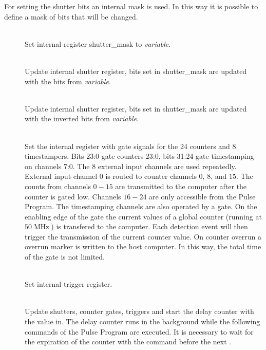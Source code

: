 \documentclass[11pt]{scrartcl}
\newcommand{\unit}[1]{\ensuremath{\operatorname{#1}}}
\begin{document}
For setting the shutter bits an internal mask is used. In this way it is possible to define a mask of bits that will be changed.
\begin{addmargin}{1cm}
\begin{description}
\item[ ]  \hfill\\  
Set internal register shutter\_mask to {\it variable}.

\item[ ]  \hfill\\  
Update internal shutter register, bits set in shutter\_mask are updated with the bits from {\it variable}.

\item[ ]  \hfill\\  
Update internal shutter register, bits set in shutter\_mask are updated with the inverted bits from {\it variable}.

\item[ ]  \hfill\\  
Set the internal register with gate signals for the 24 counters and 8 timestampers. Bits 23:0 gate counters 23:0, bits 31:24 gate  timestamping on channels 7:0. The $8$ external input channels are used repeatedly. External input channel $0$ is routed to counter channels $0$, $8$, and $15$. The counts from channels $0 - 15$ are transmitted to the computer after the counter is gated low. Channels $16-24$ are only accessible from the Pulse Program. The timestamping channels are also operated by a gate. On the enabling edge of the gate the current values of a global counter (running at $50\unit{MHz}$) is transfered to the computer. Each detection event will then trigger the transmission of the current counter value. On counter overrun a overrun marker is written to the host computer. In this way, the total time of the gate is not limited.

\item[ ] \hfill\\   
Set internal trigger register.

\item[  ]  \hfill\\  
Update shutters, counter gates, triggers and start the delay counter with the value in. The delay counter runs in the background while the following commands of the Pulse Program are executed. It is necessary to wait for the expiration of the counter with the  command before the next .


\end{description}
\end{addmargin}
\end{document}
